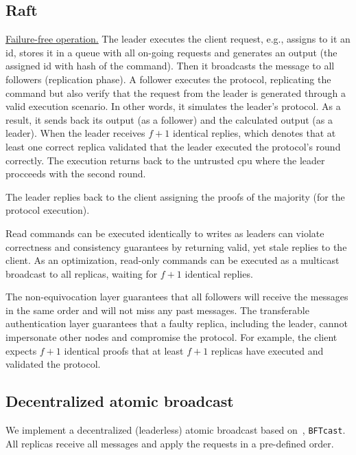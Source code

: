 \subsection{Raft}

 {\underline{Failure-free operation.}} The leader executes the client request, e.g., assigns to it an id, stores it in a queue with all on-going requests and generates an output (the assigned id with hash of the command). Then it broadcasts the message to all followers (replication phase). A follower executes the protocol, replicating the command but also verify that the request from the leader is generated through a valid execution scenario. In other words, it simulates the leader's protocol. As a result, it sends back its output (as a follower) and the calculated output (as a leader). When the leader receives $f+1$ identical replies, which denotes that at least one correct replica validated that the leader executed the protocol's round correctly. The execution returns back to the untrusted cpu where the leader procceeds with the second round. 

The leader replies back to the client assigning the proofs of the majority (for the protocol execution). 



 Read commands can be executed identically to writes as leaders can violate correctness and consistency guarantees by returning valid, yet stale replies to the client. As an optimization, read-only commands can be executed as a multicast broadcast to all replicas, waiting for $f+1$ identical replies.


 The non-equivocation layer guarantees that all followers will receive the messages in the same order and will not miss any past messages. The transferable authentication layer guarantees that a faulty replica, including the leader, cannot impersonate other nodes and compromise the protocol. For example, the client expects $f+1$ identical proofs that at least $f+1$ replicas have executed and validated the protocol.
\fi



\subsection{Decentralized atomic broadcast}
We implement a decentralized (leaderless) atomic broadcast based on~\cite{}, \texttt{BFTcast}. All replicas receive all messages and apply the requests in a pre-defined order.


